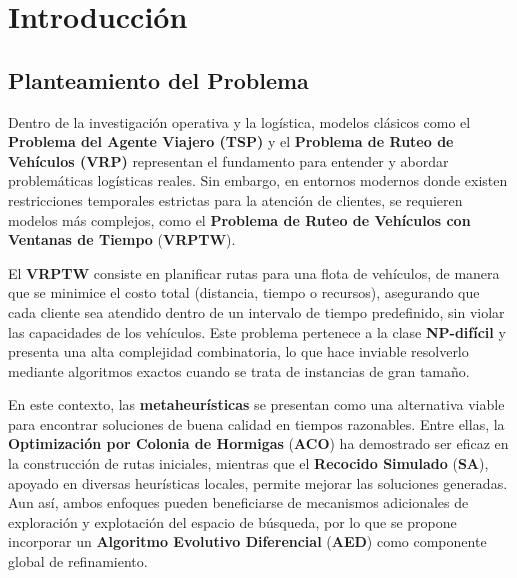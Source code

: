 \documentclass[12pt,titlepage,twoside,openright]{book}
\begin{document}
\vspace{0.5cm}

\mainmatter
\pagestyle{fancy}
\fancyhf{}
\fancyhead[RO,LE]{\bfseries \thepage}
\fancyhead[LO]{\nouppercase{\rightmark}}
\fancyhead[RE]{\nouppercase{\leftmark}}
\fancyfoot{}

\setlength{\parindent}{2em}
\setlength{\parskip}{1.5ex}


\newcommand{\tab}{\hspace*{1cm}}

\chapter{Introducción}
\label{cap:introduccion}

\section{Planteamiento del Problema}

Dentro de la investigación operativa y la logística, modelos clásicos como el \textbf{Problema del Agente Viajero (TSP)} y el \textbf{Problema de Ruteo de Vehículos (VRP)} representan el fundamento para entender y abordar problemáticas logísticas reales. Sin embargo, en entornos modernos donde existen restricciones temporales estrictas para la atención de clientes, se requieren modelos más complejos, como el \textbf{Problema de Ruteo de Vehículos con Ventanas de Tiempo} (\textbf{VRPTW}).

El \textbf{VRPTW} consiste en planificar rutas para una flota de vehículos, de manera que se minimice el costo total (distancia, tiempo o recursos), asegurando que cada cliente sea atendido dentro de un intervalo de tiempo predefinido, sin violar las capacidades de los vehículos. Este problema pertenece a la clase \textbf{NP-difícil} y presenta una alta complejidad combinatoria, lo que hace inviable resolverlo mediante algoritmos exactos cuando se trata de instancias de gran tamaño.

En este contexto, las \textbf{metaheurísticas} se presentan como una alternativa viable para encontrar soluciones de buena calidad en tiempos razonables. Entre ellas, la \textbf{Optimización por Colonia de Hormigas} (\textbf{ACO}) ha demostrado ser eficaz en la construcción de rutas iniciales, mientras que el \textbf{Recocido Simulado} (\textbf{SA}), apoyado en diversas heurísticas locales, permite mejorar las soluciones generadas. Aun así, ambos enfoques pueden beneficiarse de mecanismos adicionales de exploración y explotación del espacio de búsqueda, por lo que se propone incorporar un \textbf{Algoritmo Evolutivo Diferencial} (\textbf{AED}) como componente global de refinamiento.
\end{document}
